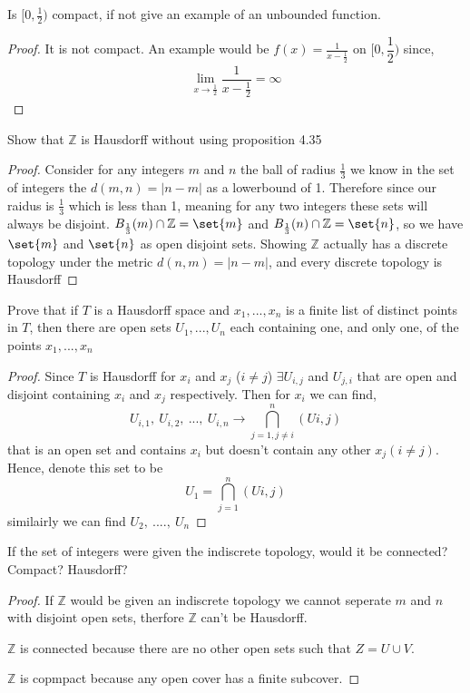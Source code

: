 \documentclass[12pt]{article}
\DeclarePairedDelimiter\set\{\}
\newcommand      {\Zm}         {{\mathbb Z}}
\begin{document}
 Is $[0,\frac{1}{2})$ compact, if not give an example of an unbounded function. 
\begin{proof}
    It is not compact. An example would be $f(x) = \frac{1}{x - \frac{1}{2}}$ on $[0,\dfrac{1}{2})$ since,
    \begin{align*}
        \lim_{x \to \frac{1}{2}}\dfrac{1}{x-\frac{1}{2}} = \infty  
    \end{align*}
\end{proof}

 Show that $\Zm$ is Hausdorff without using proposition 4.35

\begin{proof}
    Consider for any integers $m$ and $n$ the ball of radius $\frac{1}{3}$ we know in the set of integers the $d(m,n) = |n-m|$ as a lowerbound of 1. Therefore since our raidus is $\frac{1}{3}$ which is less than 1, meaning for any two integers these sets will always be disjoint. $B_{\frac{1}{3}}(m)\cap \Zm = \set{m}$ and $B_{\frac{1}{3}}(n) \cap \Zm= \set{n}$, so we have $\set{m}$ and $\set{n}$ as open disjoint sets. Showing $\Zm$ actually has a discrete topology under the metric $d(n,m) = |n-m|$, and every discrete topology is Hausdorff
\end{proof}

 Prove that if $T$ is a Hausdorff space and $x_1,...,x_n$ is a finite list of distinct points in $T$, then there are open sets $U_1,...,U_n$ each containing one, and only one, of the points $x_1,...,x_n$

\begin{proof}
    Since $T$ is Hausdorff for $x_i$ and $x_j$ ($i \neq j$) $\exists U_{i,j}$ and $U_{j,i}$ that are open and disjoint containing $x_i$ and $x_j$ respectively. Then for $x_i$ we can find, \[U_{i,1},\ U_{i,2},\ ...,\ U_{i,n} \rightarrow \bigcap_{j =1, j \neq i}^n (U{i,j})\] that is an open set and contains $x_i$ but doesn't contain any other $x_j (i\neq j)$. Hence, denote this set to be \[U_1 = \bigcap_{j = 1}^n(U{i,j})\] similairly we can find $U_2,\ ....,\ U_n$
\end{proof}

 If the set of integers were given the indiscrete topology, would it be connected? Compact? Hausdorff?
\begin{proof}
    If $\Zm$ would be given an indiscrete topology we cannot seperate $m$ and $n$ with disjoint open sets, therfore $\Zm$ can't be Hausdorff.
    
    $\Zm$ is connected because there are no other open sets such that $Z = U \cup V$.

    $\Zm$ is copmpact because any open cover has a finite subcover. 
\end{proof}
\end{document}
